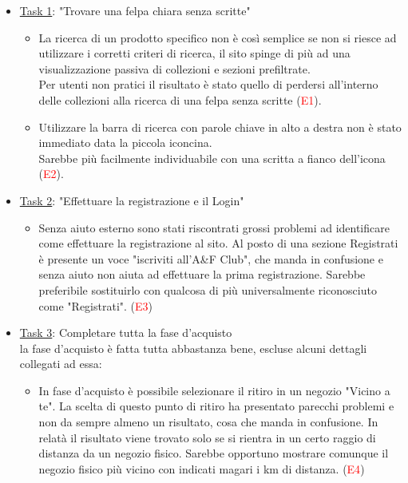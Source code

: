 \documentclass[12pt,a4paper]{report}
\begin{document}
  \begin{itemize}
    \item \underline{Task 1}: "Trovare una felpa chiara senza scritte"
    \begin{itemize}
    \item La ricerca di un prodotto specifico non è così semplice se non si riesce ad utilizzare i corretti criteri di ricerca, il sito spinge di più ad una visualizzazione passiva di collezioni e sezioni prefiltrate. \\Per utenti non pratici il risultato è stato quello di perdersi all'interno delle collezioni alla ricerca di una felpa senza scritte (\textcolor{red}{E1}).
    \item Utilizzare la barra di ricerca con parole chiave in alto a destra non è stato immediato data la piccola iconcina. \\Sarebbe più facilmente individuabile con una scritta a fianco dell'icona (\textcolor{red}{E2}).
    \end{itemize}
    \item \underline{Task 2}: "Effettuare la registrazione e il Login"
    \begin{itemize}
      \item Senza aiuto esterno sono stati riscontrati grossi problemi ad identificare come effettuare la registrazione al sito. Al posto di una sezione Registrati è presente un voce "iscriviti all'A\&F Club", che manda in confusione e senza aiuto non aiuta ad effettuare la prima registrazione. Sarebbe preferibile sostituirlo con qualcosa di più universalmente riconosciuto come "Registrati". (\textcolor{red}{E3})
    \end{itemize}
    \item \underline{Task 3}: Completare tutta la fase d’acquisto\\
    la fase d'acquisto è fatta tutta abbastanza bene, escluse alcuni dettagli collegati ad essa:
    \begin{itemize}
      \item In fase d'acquisto è possibile selezionare il ritiro in un negozio "Vicino a te". La scelta di questo punto di ritiro ha presentato parecchi problemi e non da sempre almeno un risultato, cosa che manda in confusione. In relatà il risultato viene trovato solo se si rientra in un certo raggio di distanza da un negozio fisico. Sarebbe opportuno mostrare comunque il negozio fisico più vicino con indicati magari i km di distanza. (\textcolor{red}{E4})
    \end{itemize}
  \end{itemize}
\end{document}
